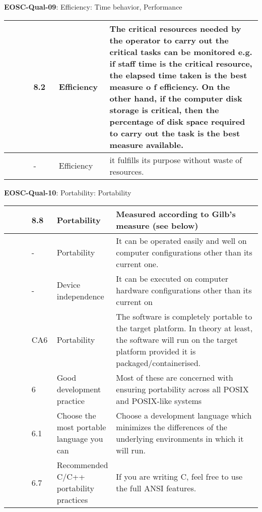\textbf{EOSC-Qual-09}: Efficiency: Time behavior, Performance
\nopagebreak[4]
\begin{center}
    \tabletail{\hline}
    \tiny
    \begin{supertabular}{|p{0.10\linewidth}|p{0.10\linewidth}|p{0.20\linewidth}|p{0.60\linewidth}|} \hline
        \cite{gillies_modelling_1992} & 8.2 & Efficiency & The critical resources needed by the operator to carry out the critical tasks can be monitored e.g. if staff time is the critical resource, the elapsed time taken is the best measure o f efficiency. On the other hand, if the computer disk storage is critical, then the percentage of disk space required to carry out the task is the best measure available.\\ \hline
        \cite{boehm_quantitative_1976} & - & Efficiency & it fulfills its purpose without waste of resources.\\ \hline
    \end{supertabular}
\end{center}

\textbf{EOSC-Qual-10}: Portability: Portability
\nopagebreak[4]
\begin{center}
    \tabletail{\hline}
    \tiny
    \begin{supertabular}{|p{0.10\linewidth}|p{0.10\linewidth}|p{0.20\linewidth}|p{0.60\linewidth}|} \hline
        \cite{gillies_modelling_1992} & 8.8 & Portability & Measured according to Gilb's measure (see below)\\ \hline
        \cite{boehm_quantitative_1976} & - & Portability & It can be operated easily and well on computer configurations other than its current one.\\ \hline
        \cite{boehm_quantitative_1976} & - & Device independence & It can be executed on computer hardware configurations other than its current on\\ \hline
        \cite{shepherdson_cessda_2019} & CA6 & Portability & The software is completely portable to the target platform. In theory at least, the software will run on the target platform provided it is packaged/containerised.\\ \hline
        \cite{raymond_software_2013} & 6 & Good development practice & Most of these are concerned with ensuring portability across all POSIX and POSIX-like systems\\ \hline
        \cite{raymond_software_2013} & 6.1 & Choose the most portable language you can & Choose a development language which minimizes the differences of the underlying environments in which it will run.\\ \hline
        \cite{raymond_software_2013} & 6.7 & Recommended C/C++ portability practices & If you are writing C, feel free to use the full ANSI features.\\ \hline
    \end{supertabular}
\end{center}

